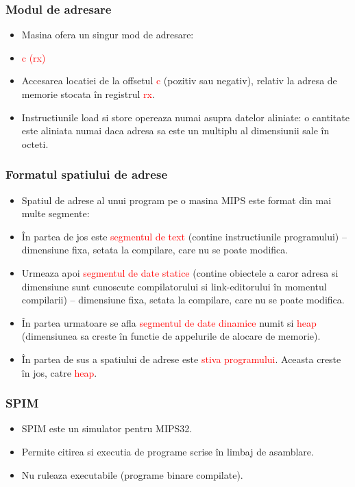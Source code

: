 \documentclass[pdf]{beamer}
\begin{document}
\begin{frame}
\frametitle{Modul de adresare}
\begin{itemize}
\item
Masina ofera un singur mod de adresare:
\item \hspace{25mm}
\textcolor{red}{c (rx)}
\item
Accesarea locatiei de la offsetul \textcolor{red}{c} (pozitiv sau negativ), relativ la adresa de memorie stocata în registrul \textcolor{red}{rx}.
\item
Instructiunile load si store opereaza numai asupra datelor aliniate: o cantitate este aliniata numai daca adresa sa este un multiplu al dimensiunii sale în octeti.
\end{itemize}
\end{frame}



\begin{frame}
\frametitle{Formatul spatiului de adrese}
\begin{itemize}
\item
Spatiul de adrese al unui program pe o masina MIPS este format din mai multe segmente:
\item
În partea de jos este \textcolor{red}{segmentul de text} (contine instructiunile programului) – dimensiune fixa, setata la compilare, care nu se poate modifica.
\item
Urmeaza apoi \textcolor{red}{segmentul de date statice} (contine obiectele a caror adresa si dimensiune sunt cunoscute compilatorului si link-editorului în momentul compilarii) – dimensiune fixa, setata la compilare, care nu se poate modifica.
\item
În partea urmatoare se afla \textcolor{red}{segmentul de date dinamice} numit si \textcolor{red}{heap} (dimensiunea sa creste în functie de appelurile de alocare de memorie).
\item
În partea de sus a spatiului de adrese este \textcolor{red}{stiva programului}. Aceasta creste în jos, catre \textcolor{red}{heap}.
\end{itemize}
\end{frame}



\begin{frame}
\frametitle{SPIM}
\begin{itemize}
\item
SPIM este un simulator pentru MIPS32.
\item
Permite citirea si executia de programe scrise în limbaj de asamblare.
\item
Nu ruleaza executabile (programe binare compilate).
\end{itemize}
\end{frame}
\end{document}
